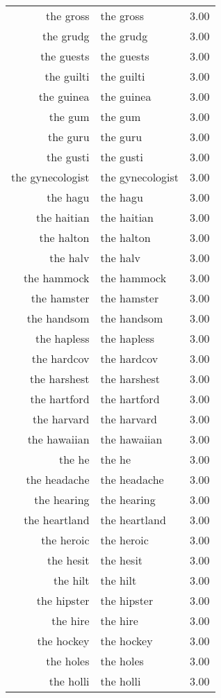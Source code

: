 \begin{table}[ht]
\begin{tabular}{rlr}
  the gross & the gross & 3.00 \\ 
  the grudg & the grudg & 3.00 \\ 
  the guests & the guests & 3.00 \\ 
  the guilti & the guilti & 3.00 \\ 
  the guinea & the guinea & 3.00 \\ 
  the gum & the gum & 3.00 \\ 
  the guru & the guru & 3.00 \\ 
  the gusti & the gusti & 3.00 \\ 
  the gynecologist & the gynecologist & 3.00 \\ 
  the hagu & the hagu & 3.00 \\ 
  the haitian & the haitian & 3.00 \\ 
  the halton & the halton & 3.00 \\ 
  the halv & the halv & 3.00 \\ 
  the hammock & the hammock & 3.00 \\ 
  the hamster & the hamster & 3.00 \\ 
  the handsom & the handsom & 3.00 \\ 
  the hapless & the hapless & 3.00 \\ 
  the hardcov & the hardcov & 3.00 \\ 
  the harshest & the harshest & 3.00 \\ 
  the hartford & the hartford & 3.00 \\ 
  the harvard & the harvard & 3.00 \\ 
  the hawaiian & the hawaiian & 3.00 \\ 
  the he & the he & 3.00 \\ 
  the headache & the headache & 3.00 \\ 
  the hearing & the hearing & 3.00 \\ 
  the heartland & the heartland & 3.00 \\ 
  the heroic & the heroic & 3.00 \\ 
  the hesit & the hesit & 3.00 \\ 
  the hilt & the hilt & 3.00 \\ 
  the hipster & the hipster & 3.00 \\ 
  the hire & the hire & 3.00 \\ 
  the hockey & the hockey & 3.00 \\ 
  the holes & the holes & 3.00 \\ 
  the holli & the holli & 3.00 \\ 

\end{tabular}
\end{table}
